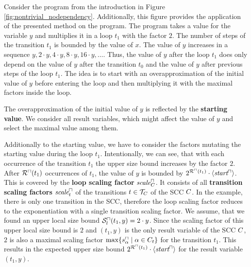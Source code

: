 \begin{example}
  
  Consider the program from the introduction in Figure \ref{fig:nontrivial_nodependency}.
  Additionally, this figure provides the application of the presented method on the program.
  The program takes a value for the variable $y$ and multiplies it in a loop $t_1$ with the factor $2$.
  The number of steps of the transition $t_1$ is bounded by the value of $x$.
  The value of $y$ increases in a sequence $y, 2 \cdot y, 4 \cdot y, 8 \cdot y, 16 \cdot y, \dots$.
  Thus, the value of $y$ after the loop $t_1$ does only depend on the value of $y$ after the transition $t_0$ and the value of $y$ after previous steps of the loop $t_1$.
  The idea is to start with an overapproximation of the initial value of $y$ before entering the loop and then multiplying it with the maximal factors inside the loop.
  
  The overapproximation of the initial value of $y$ is reflected by the \textbf{starting value}.
  We consider all result variables, which might affect the value of $y$ and select the maximal value among them.
  
  Additionally to the starting value, we have to consider the factors mutating the starting value during the loop $t_1$.
  Intentionally, we can see, that with each occurrence of the transition $t_1$ the upper size bound increases by the factor $2$.
  After ${\mathcal{R}^\sqcap}(t_1)$ occurrences of $t_1$, the value of $y$ is bounded by $2^{{\mathcal{R}^\sqcap}(t_1)} \cdot \langle\emph{start}^\sqcap\rangle$.
  This is covered by the \textbf{loop scaling factor} $\emph{scale}^\sqcap_C$.
  It consists of all \textbf{transition scaling factors} $\emph{scale}^\sqcap_t$ of the transitions $t \in \mathcal{T}_C$ of the SCC $C$.
  In the example, there is only one transition in the SCC, therefore the loop scaling factor reduces to the exponentiation with a single transition scaling factor.
  We assume, that we found an upper local size bound ${\mathcal{S}^\sqcap_l}(t_1,y) = 2 \cdot y$.
  Since the scaling factor of this upper local size bound is $2$ and $(t_1,y)$ is the only result variable of the SCC $C$, $2$ is also a maximal scaling factor $\max \lbrace s^\sqcap_\alpha \mid \alpha \in C_t \rbrace$ for the transition $t_1$.
  This results in the expected upper size bound $2^{{\mathcal{R}^\sqcap}(t_1)} \cdot \langle\emph{start}^\sqcap\rangle$ for the result variable $(t_1,y)$.
\end{example}

